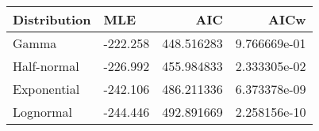 \begin{tabular}{llrr}
\toprule
Distribution &      MLE &         AIC &          AICw \\
\midrule
       Gamma & -222.258 &  448.516283 &  9.766669e-01 \\
 Half-normal & -226.992 &  455.984833 &  2.333305e-02 \\
 Exponential & -242.106 &  486.211336 &  6.373378e-09 \\
   Lognormal & -244.446 &  492.891669 &  2.258156e-10 \\
\bottomrule
\end{tabular}
